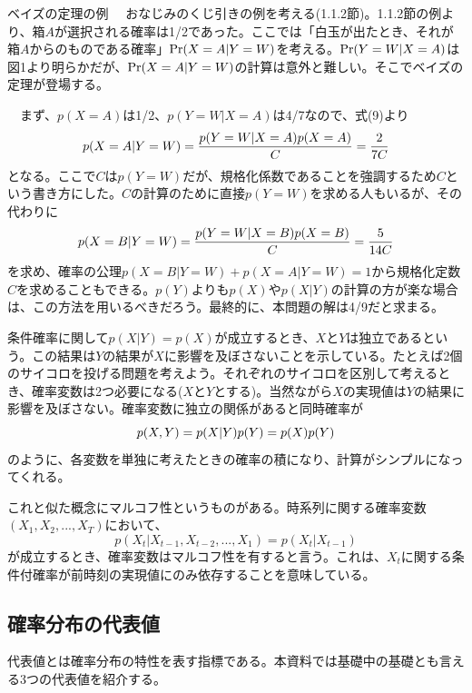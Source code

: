 \documentclass[dvipdfmx, 9pt, a4paper]{jsarticle}
\begin{document}
\begin{itembox}[l]{ベイズの定理の例}
　おなじみのくじ引きの例を考える(1.1.2節)。1.1.2節の例より、箱$A$が選択される確率は1/2であった。ここでは「白玉が出たとき、それが箱$A$からのものである確率」${\rm Pr}(X=A|Y=W)$を考える。${\rm Pr}(Y=W|X=A)$は図1より明らかだが、${\rm Pr}(X=A|Y=W)$の計算は意外と難しい。そこでベイズの定理が登場する。\par
　まず、$p(X=A)$は1/2、$p(Y=W|X=A)$は4/7なので、式(9)より
\begin{equation}
p(X=A|Y=W)=\frac{p(Y=W|X=A)p(X=A)}{C}=\frac{2}{7C} \notag
\end{equation}
となる。ここで$C$は$p(Y=W)$だが、規格化係数であることを強調するため$C$という書き方にした。$C$の計算のために直接$p(Y=W)$を求める人もいるが、その代わりに
\begin{equation}
p(X=B|Y=W)=\frac{p(Y=W|X=B)p(X=B)}{C}=\frac{5}{14C} \notag
\end{equation}
を求め、確率の公理$p(X=B|Y=W)+p(X=A|Y=W)=1$から規格化定数$C$を求めることもできる。$p(Y)$よりも$p(X)$や$p(X|Y)$の計算の方が楽な場合は、この方法を用いるべきだろう。最終的に、本問題の解は4/9だと求まる。
\end{itembox}\bigskip \par
条件確率に関して$p(X|Y)=p(X)$が成立するとき、$X$と$Y$は独立であるという。この結果は$Y$の結果が$X$に影響を及ぼさないことを示している。たとえば2個のサイコロを投げる問題を考えよう。それぞれのサイコロを区別して考えるとき、確率変数は2つ必要になる($X$と$Y$とする)。当然ながら$X$の実現値は$Y$の結果に影響を及ぼさない。確率変数に独立の関係があると同時確率が
\begin{equation}
p(X,Y)=p(X|Y)p(Y)=p(X)p(Y) \notag
\end{equation}
のように、各変数を単独に考えたときの確率の積になり、計算がシンプルになってくれる。\par
これと似た概念にマルコフ性というものがある。時系列に関する確率変数$(X_1, X_2, ..., X_T)$において、
\begin{equation}
p(X_t|X_{t-1}, X_{t-2}, ..., X_1)=p(X_t|X_{t-1})
\end{equation}
が成立するとき、確率変数はマルコフ性を有すると言う。これは、$X_t$に関する条件付確率が前時刻の実現値にのみ依存することを意味している。

\subsection{確率分布の代表値}
代表値とは確率分布の特性を表す指標である。本資料では基礎中の基礎とも言える3つの代表値を紹介する。
\end{document}
